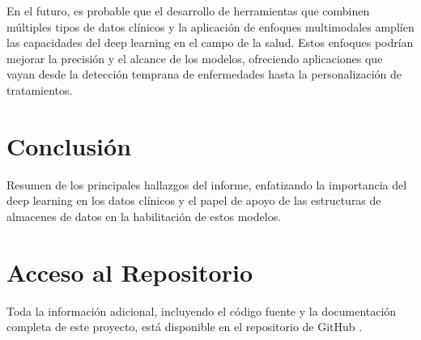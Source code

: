 \documentclass{article}
\begin{document}
En el futuro, es probable que el desarrollo de herramientas que combinen múltiples tipos de datos clínicos y la aplicación de enfoques multimodales amplíen las capacidades del deep learning en el campo de la salud. Estos enfoques podrían mejorar la precisión y el alcance de los modelos, ofreciendo aplicaciones que vayan desde la detección temprana de enfermedades hasta la personalización de tratamientos.


\section{Conclusión}
Resumen de los principales hallazgos del informe, enfatizando la importancia del deep learning en los datos clínicos y el papel de apoyo de las estructuras de almacenes de datos en la habilitación de estos modelos.

\newpage
\section{Acceso al Repositorio}

Toda la información adicional, incluyendo el código fuente y la documentación completa de este proyecto, está disponible en el repositorio de GitHub \cite{silva2024github}.

\end{document}
